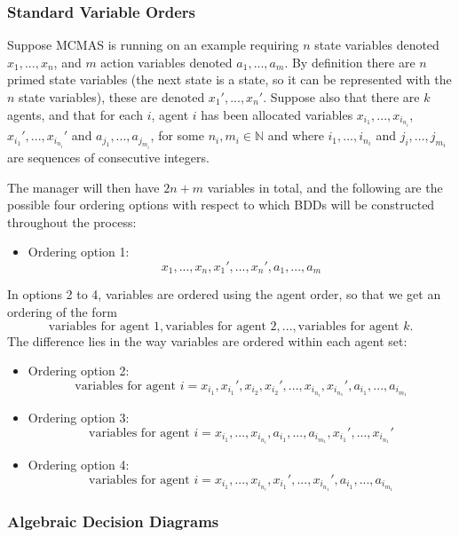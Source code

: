 \documentclass[11pt]{article}
\begin{document}
\subsubsection{Standard Variable Orders}
 \label{std_orderings}
Suppose MCMAS is running on an example requiring $n$ state variables denoted $x_1, ..., x_n$, and $m$ action variables denoted $a_1, ..., a_m$. By definition there are $n$ primed state variables (the next state is a state, so it can be represented with the $n$ state variables), these are denoted $x_1', ..., x_n'$. 
Suppose also that there are $k$ agents, and that for each $i$, agent $i$ has been allocated variables $x_{i_1}, ..., x_{i_{n_i}}$, $x_{i_1}', ..., x_{i_{n_i}}'$ and $a_{j_1}, ..., a_{j_{m_i}}$, for some $n_i, m_i \in \mathbb{N}$ and where $i_1, ..., i_{n_i}$ and $j_i, ..., j_{m_i}$ are sequences of consecutive integers.



The manager will then have $2n + m$ variables in total, and the following are the possible four ordering options with respect to which BDDs will be constructed throughout the process:
\begin{itemize}
\item Ordering option 1:
$$x_1, ..., x_n, x_1', ..., x_n', a_1, ..., a_m$$
\end{itemize}
In options 2 to 4, variables are ordered using the agent order, so that we get an ordering of the form $$ \mbox{variables for agent } 1, \mbox{variables for agent } 2, ...,  \mbox{variables for agent } k.$$ 
The difference lies in the way variables are ordered within each agent set:
\begin{itemize}
\item Ordering option 2:
$$
 \mbox{variables for agent } i = x_{i_1}, x_{i_1}', x_{i_2}, x_{i_2}',..., x_{i_{n_i}}, x_{i_{n_1}}', a_{i_1}, ..., a_{i_{m_1}}
$$
\item Ordering option 3:
$$
 \mbox{variables for agent } i = x_{i_1}, ..., x_{i_{n_i}},a_{i_1}, ..., a_{i_{m_1}}, x_{i_1}', ..., x_{i_{n_1}}'
$$
\item Ordering option 4:
$$
 \mbox{variables for agent } i = x_{i_1}, ..., x_{i_{n_i}}, x_{i_1}', ..., x_{i_{n_1}}', a_{i_1}, ..., a_{i_{m_1}}
$$

\end{itemize}

\subsubsection{Algebraic Decision Diagrams}
\end{document}
